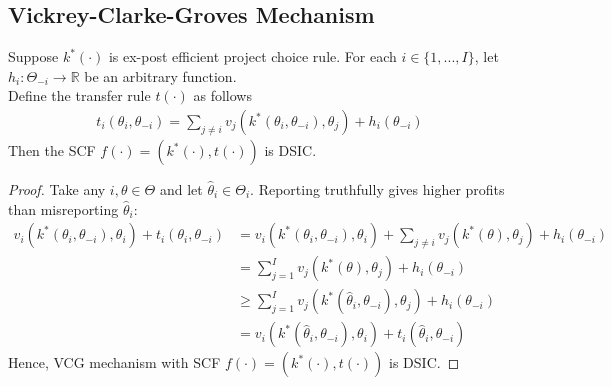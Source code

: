 \documentclass[11pt]{elegantbook}
\begin{document}
\subsection{Vickrey-Clarke-Groves Mechanism}
\begin{proposition}
    Suppose $k^*(\cdot)$ is ex-post efficient project choice rule. For each $i\in \{1,...,I\}$, let $h_i:\Theta_{-i} \rightarrow \mathbb{R}$ be an arbitrary function.\\
    Define the transfer rule $t(\cdot)$ as follows
    \begin{equation}
        \begin{aligned}
            t_i(\theta_i,\theta_{-i})=\sum_{j\neq i}v_j(k^*(\theta_i,\theta_{-i}),\theta_j)+h_i(\theta_{-i})
        \end{aligned}
        \nonumber
    \end{equation}
    Then the SCF $f(\cdot)=\left(k^*(\cdot),t(\cdot)\right)$ is DSIC.
\end{proposition}
\begin{proof}
    Take any $i,\theta\in\Theta$ and let $\hat{\theta}_i\in\Theta_i$.
    Reporting truthfully gives higher profits than misreporting $\hat{\theta}_i$:
        \begin{equation}
            \begin{aligned}
                v_i(k^*(\theta_i,\theta_{-i}),\theta_i)+t_i(\theta_i,\theta_{-i})&=v_i(k^*(\theta_i,\theta_{-i}),\theta_i)+\sum_{j\neq i}v_j(k^*(\theta),\theta_j)+h_i(\theta_{-i})\\
                &=\sum_{j=1}^Iv_j(k^*(\theta),\theta_j)+h_i(\theta_{-i})\\
                &\geq \sum_{j=1}^Iv_j(k^*(\hat{\theta}_i,\theta_{-i}),\theta_j)+h_i(\theta_{-i})\\
                &=v_i(k^*(\hat{\theta}_i,\theta_{-i}),\theta_i)+t_i(\hat{\theta}_i,\theta_{-i})
            \end{aligned}
            \nonumber
        \end{equation}
    Hence, VCG mechanism with SCF $f(\cdot)=\left(k^*(\cdot),t(\cdot)\right)$ is DSIC.
\end{proof}
\end{document}
